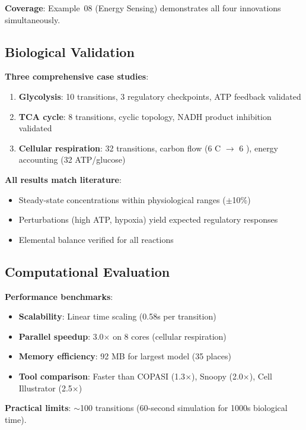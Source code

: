 \textbf{Coverage}: Example~08 (Energy Sensing) demonstrates all four innovations simultaneously.

\subsection{Biological Validation}
\label{subsec:bio-validation}

\textbf{Three comprehensive case studies}:
\begin{enumerate}
    \item \textbf{Glycolysis}: 10 transitions, 3 regulatory checkpoints, ATP feedback validated
    \item \textbf{TCA cycle}: 8 transitions, cyclic topology, NADH product inhibition validated
    \item \textbf{Cellular respiration}: 32 transitions, carbon flow (6 C $\to$ 6 ), energy accounting (32 ATP/glucose)
\end{enumerate}

\textbf{All results match literature}:
\begin{itemize}
    \item Steady-state concentrations within physiological ranges ($\pm$10\%)
    \item Perturbations (high ATP, hypoxia) yield expected regulatory responses
    \item Elemental balance verified for all reactions
\end{itemize}

\subsection{Computational Evaluation}
\label{subsec:comp-evaluation}

\textbf{Performance benchmarks}:
\begin{itemize}
    \item \textbf{Scalability}: Linear time scaling (0.58s per transition)
    \item \textbf{Parallel speedup}: 3.0$\times$ on 8 cores (cellular respiration)
    \item \textbf{Memory efficiency}: 92 MB for largest model (35 places)
    \item \textbf{Tool comparison}: Faster than COPASI (1.3$\times$), Snoopy (2.0$\times$), Cell Illustrator (2.5$\times$)
\end{itemize}

\textbf{Practical limits}: $\sim$100 transitions (60-second simulation for 1000s biological time).

